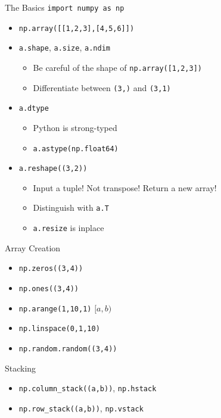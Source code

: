 \documentclass{../TexTemplate/myslide}
\begin{document}
\begin{frame}[fragile]{The Basics}
\verb'import numpy as np'
\begin{itemize}
	\item \verb'np.array([[1,2,3],[4,5,6]])'
	\item \verb'a.shape', \verb'a.size', \verb'a.ndim'
	\begin{itemize}
		\item Be careful of the shape of \verb'np.array([1,2,3])'
		\item Differentiate between \verb'(3,)' and \verb'(3,1)'
	\end{itemize}
	\item \verb'a.dtype'
	\begin{itemize}
		\item Python is strong-typed
		\item \verb'a.astype(np.float64)'
	\end{itemize}
	\item \verb'a.reshape((3,2))'
	\begin{itemize}
		\item Input a tuple! Not transpose! Return a new array!
		\item Distinguish with \verb'a.T'
		\item \verb'a.resize' is inplace
	\end{itemize}
\end{itemize}
\end{frame}

\begin{frame}[fragile]{Array Creation}
\begin{itemize}
	\item \verb'np.zeros((3,4))'
	\item \verb'np.ones((3,4))'
	\item \verb'np.arange(1,10,1)' $[a,b)$
	\item \verb'np.linspace(0,1,10)'
	\item \verb'np.random.random((3,4))'
\end{itemize}
\end{frame}

\begin{frame}[fragile]{Stacking}
\begin{itemize}
	\item \verb'np.column_stack((a,b))', \verb'np.hstack'
	\item \verb'np.row_stack((a,b))', \verb'np.vstack'
\end{itemize}
\end{frame}
\end{document}
